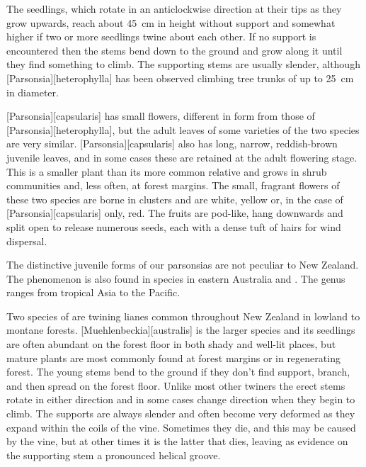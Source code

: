 The seedlings, which rotate in an anticlockwise direction at their tips as they grow upwards, reach about \SI{45}{\centi\metre} in height without support and somewhat higher if two or more seedlings twine about each other.
If no support is encountered then the stems bend down to the ground and grow along it until they find something to climb.
The supporting stems are usually slender, although [Parsonsia][heterophylla] has been observed climbing tree trunks of up to \SI{25}{\centi\metre} in diameter.

[Parsonsia][capsularis] has small flowers, different in form from those of [Parsonsia][heterophylla], but the adult leaves of some varieties of the two species are very similar. [Parsonsia][capsularis] also has long, narrow, reddish-brown juvenile leaves, and in some cases these are retained at the adult flowering stage.
This is a smaller plant than its more common relative and grows in shrub communities and, less often, at forest margins.
The small, fragrant flowers of these two species are borne in clusters and are white, yellow or, in the case of [Parsonsia][capsularis] only, red.
The fruits are pod-like, hang downwards and split open to release numerous seeds, each with a dense tuft of hairs for wind dispersal.

The distinctive juvenile forms of our parsonsias are not peculiar to New Zealand.
The phenomenon is also found in species in eastern Australia and .
The genus ranges from tropical Asia to the Pacific.

Two species of  are twining lianes common throughout New Zealand in lowland to montane forests. [Muehlenbeckia][australis] is the larger species and its seedlings are often abundant on the forest floor in both shady and well-lit places, but mature plants are most commonly found at forest margins or in regenerating forest.
The young stems bend to the ground if they don't find support, branch, and then spread on the forest floor.
Unlike most other twiners the erect stems rotate in either direction and in some cases change direction when they begin to climb.
The supports are always slender and often become very deformed as they expand within the coils of the vine.
Sometimes they die, and this may be caused by the vine, but at other times it is the latter that dies, leaving as evidence on the supporting stem a pronounced helical groove.

